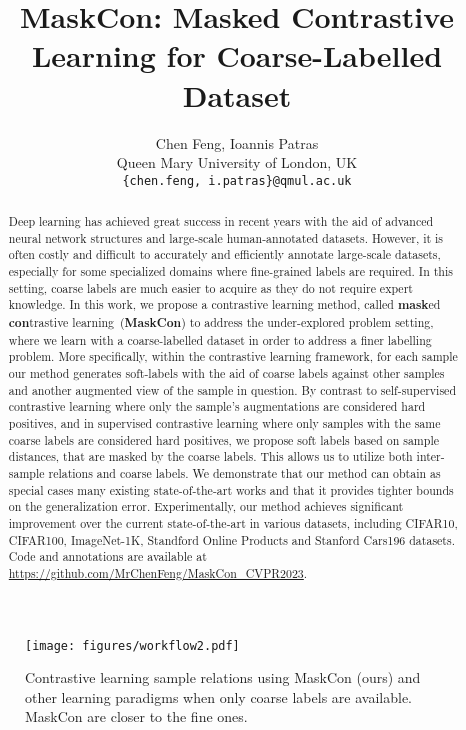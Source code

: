 \documentclass[10pt,twocolumn,letterpaper]{article}
\title{MaskCon: Masked Contrastive Learning for Coarse-Labelled Dataset}
\begin{document}
\author{Chen Feng, Ioannis Patras\\
Queen Mary University of London, UK\\
{\tt\small \{chen.feng, i.patras\}@qmul.ac.uk}
}
\maketitle

\begin{abstract}
Deep learning has achieved great success in recent years with the aid of advanced neural network structures and large-scale human-annotated datasets. However, it is often costly and difficult to accurately and efficiently annotate large-scale datasets, especially for some specialized domains where fine-grained labels are required. In this setting, coarse labels are much easier to acquire as they do not require expert knowledge. In this work, we propose a contrastive learning method, called \textbf{mask}ed \textbf{con}trastive learning~(\textbf{MaskCon}) to address the under-explored problem setting, where we learn with a coarse-labelled dataset in order to address a finer labelling problem. More specifically, within the contrastive learning framework, for each sample our method generates soft-labels  with the aid of coarse labels against other samples and another augmented view of the sample in question. 
By contrast to self-supervised contrastive learning where only the sample's augmentations are considered hard positives, and in supervised contrastive learning where only samples with the same coarse labels are considered hard positives, we propose soft labels based on sample distances, that are masked by the coarse labels. This allows us to utilize both inter-sample relations and coarse labels. 
We demonstrate that our method can obtain as special cases many existing state-of-the-art works and that it provides tighter bounds on the generalization error. 
Experimentally, our method achieves significant improvement over the current state-of-the-art in various datasets, including CIFAR10, CIFAR100, ImageNet-1K, Standford Online Products and Stanford Cars196 datasets. Code and annotations are available at \url{https://github.com/MrChenFeng/MaskCon_CVPR2023}.
\end{abstract}

\begin{figure}[htbp]
    \centering
    \texttt{[image: figures/workflow2.pdf]}
\caption{Contrastive learning sample relations using MaskCon (ours) and other learning paradigms when only coarse labels are available. MaskCon are closer to the fine ones.}
    \label{fig:intro_mechanism_toy}
\end{figure}
\end{document}
